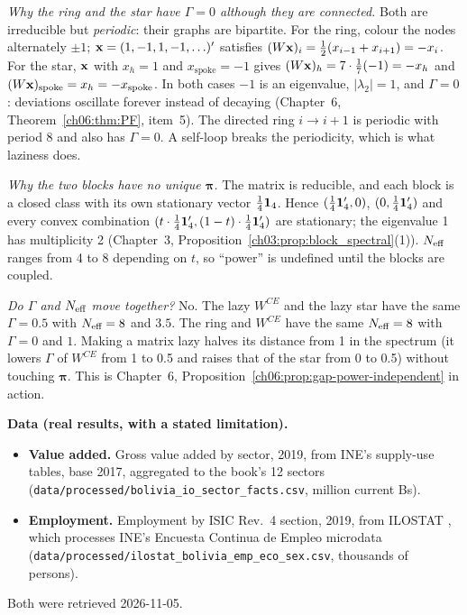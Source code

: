 \documentclass[../solutions_manual.tex]{subfiles}
\begin{document}
\emph{Why the ring and the star have $\Gamma = 0$ although they are connected.} Both are irreducible but \emph{periodic}: their graphs are bipartite. For the ring, colour the nodes alternately $\pm1$; $\mathbf{x} = (1,-1,1,-1,\ldots)'$ satisfies $(W\mathbf{x})_i = \frac12(x_{i-1} + x_{i+1}) = -x_i$. For the star, $\mathbf{x}$ with $x_h = 1$ and $x_{\text{spoke}} = -1$ gives $(W\mathbf{x})_h = 7\cdot\frac17(-1) = -x_h$ and $(W\mathbf{x})_{\text{spoke}} = x_h = -x_{\text{spoke}}$. In both cases $-1$ is an eigenvalue, $|\lambda_2| = 1$, and $\Gamma = 0$: deviations oscillate forever instead of decaying (Chapter~6, Theorem~\ref{ch06:thm:PF}, item~5). The directed ring $i \to i+1$ is periodic with period 8 and also has $\Gamma = 0$. A self-loop breaks the periodicity, which is what laziness does.

\emph{Why the two blocks have no unique $\boldsymbol\pi$.} The matrix is reducible, and each block is a closed class with its own stationary vector $\frac14\mathbf{1}_4$. Hence $(\frac14\mathbf{1}_4', 0)$, $(0, \frac14\mathbf{1}_4')$ and every convex combination $(t\cdot\frac14\mathbf{1}_4', (1-t)\cdot\frac14\mathbf{1}_4')$ are stationary; the eigenvalue 1 has multiplicity 2 (Chapter~3, Proposition~\ref{ch03:prop:block_spectral}(1)). $N_{\text{eff}}$ ranges from 4 to 8 depending on $t$, so ``power'' is undefined until the blocks are coupled.

\emph{Do $\Gamma$ and $N_{\text{eff}}$ move together?} No. The lazy $W^{CE}$ and the lazy star have the same $\Gamma = 0.5$ with $N_{\text{eff}} = 8$ and $3.5$. The ring and $W^{CE}$ have the same $N_{\text{eff}} = 8$ with $\Gamma = 0$ and $1$. Making a matrix lazy halves its distance from 1 in the spectrum (it lowers $\Gamma$ of $W^{CE}$ from 1 to 0.5 and raises that of the star from 0 to 0.5) without touching $\boldsymbol\pi$. This is Chapter~6, Proposition~\ref{ch06:prop:gap-power-independent} in action.


\textbf{Data (real results, with a stated limitation).}
\begin{itemize}
\item \textbf{Value added.} Gross value added by sector, 2019, from INE's supply-use tables, base 2017, aggregated to the book's 12 sectors \citep{ine2026sut} (\texttt{data/processed/bolivia\_io\_sector\_facts.csv}, million current Bs).
\item \textbf{Employment.} Employment by ISIC Rev.~4 section, 2019, from ILOSTAT \citep{ilo2026ilostat}, which processes INE's Encuesta Continua de Empleo microdata (\texttt{data/processed/ilostat\_bolivia\_emp\_eco\_sex.csv}, thousands of persons).
\end{itemize}
Both were retrieved 2026-11-05.
\end{document}
